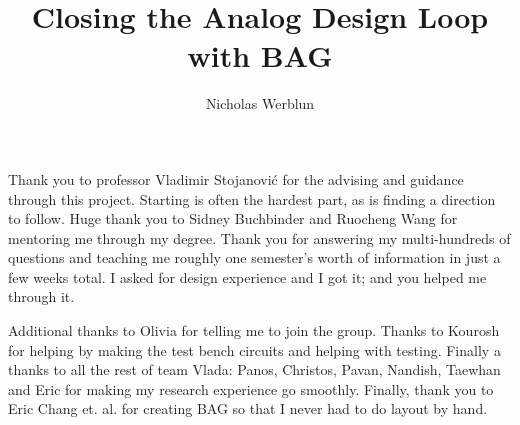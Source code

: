 \documentclass[masters]{ucbthesis}
\begin{document}

\title{Closing the Analog Design Loop with BAG}
\author{Nicholas Werblun}


\maketitle
\copyrightpage



\begin{frontmatter}



\tableofcontents
\clearpage
\listoffigures
\clearpage

\begin{acknowledgements}
Thank you to professor Vladimir Stojanovi\'c for the advising and guidance through this project. Starting is often the hardest part, as is finding a direction to follow. Huge thank you to Sidney Buchbinder and Ruocheng Wang for mentoring me through my degree. Thank you for answering my multi-hundreds of questions and teaching me roughly one semester's worth of information in just a few weeks total.  I asked for design experience and I got it; and you helped me through it.

Additional thanks to Olivia for telling me to join the group. Thanks to Kourosh for helping by making the test bench circuits and helping with testing. Finally a thanks to all the rest of team Vlada: Panos, Christos, Pavan, Nandish, Taewhan and Eric for making my research experience go smoothly. Finally, thank you to Eric Chang et. al. for creating BAG so that I never had to do layout by hand.

\end{acknowledgements}

\end{frontmatter}
\pagestyle{headings}
\end{document}
